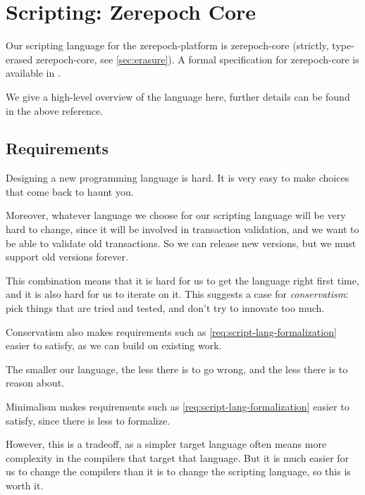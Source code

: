 \section{Scripting: Zerepoch Core}
\label{sec:zerepoch-core}

Our scripting language for the \gls{zerepoch-platform} is \gls{zerepoch-core} (strictly, type-erased \gls{zerepoch-core}, see \cref{sec:erasure}).
A formal specification for \gls{zerepoch-core} is available in \textcite{zerepoch-core-spec}.

We give a high-level overview of the language here, further details can be found in the above reference.

\subsection{Requirements}
\begin{requirement}[Conservatism]
\label{req:script-lang-conservatism}
Designing a new programming language is hard.
It is very easy to make choices that come back to haunt you.

Moreover, whatever language we choose for our scripting language will be very hard to change, since it will be involved in transaction validation, and we want to be able to validate old transactions.
So we can release new versions, but we must support old versions forever.

This combination means that it is hard for us to get the language right first time, and it is also hard for us to iterate on it.
This suggests a case for \emph{conservatism}: pick things that are tried and tested, and don't try to innovate too much.

Conservatism also makes requirements such as \cref{req:script-lang-formalization} easier to satisfy, as we can build on existing work.
\end{requirement}

\begin{requirement}[Minimalism]
\label{req:script-lang-minimalism}
The smaller our language, the less there is to go wrong, and the less there is to reason about.

Minimalism makes requirements such as \cref{req:script-lang-formalization} easier to satisfy, since there is less to formalize.

However, this is a tradeoff, as a simpler target language often means more complexity in the compilers that target that language.
But it is much easier for us to change the compilers than it is to change the scripting language, so this is worth it.
\end{requirement}

